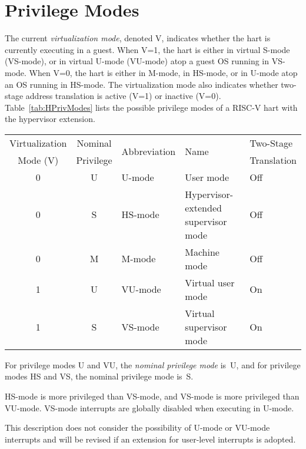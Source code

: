 \section{Privilege Modes}

The current {\em virtualization mode}, denoted V, indicates whether the hart
is currently executing in a guest.
When V=1, the hart is either in virtual S-mode (VS-mode), or in virtual U-mode
(VU-mode) atop a guest OS running in VS-mode.
When V=0, the hart is either in M-mode, in HS-mode, or in U-mode atop an OS
running in HS-mode.
The virtualization mode also indicates whether two-stage address translation
is active (V=1) or inactive (V=0).  Table~\ref{tab:HPrivModes} lists the
possible privilege modes of a RISC-V hart with the hypervisor extension.

\begin{table*}[h!]
\begin{center}
\begin{tabular}{|c|c||l|l|l|}
  \hline
   Virtualization & Nominal   & \multirow{2}{*}{Abbreviation} & \multirow{2}{*}{Name} & Two-Stage \\
   Mode (V)       & Privilege &                               &                       & Translation \\ \hline
   0              & U         & U-mode  & User mode & Off \\
   0              & S         & HS-mode & Hypervisor-extended supervisor mode & Off \\
   0              & M         & M-mode  & Machine mode & Off \\
  \hline
   1              & U         & VU-mode & Virtual user mode & On \\
   1              & S         & VS-mode & Virtual supervisor mode & On \\
  \hline
 \end{tabular}
\end{center}
\caption{Privilege modes with the hypervisor extension.}
\label{tab:HPrivModes}
\end{table*}

For privilege modes U and VU, the \textit{nominal privilege mode} is~U,
and for privilege modes HS and VS, the nominal privilege mode is~S.

HS-mode is more privileged
than VS-mode, and VS-mode is more privileged than VU-mode.
VS-mode interrupts are globally disabled when executing in U-mode.

\begin{commentary}
This description does not consider the possibility of U-mode or VU-mode interrupts and will be revised if an extension for user-level interrupts is adopted.
\end{commentary}

